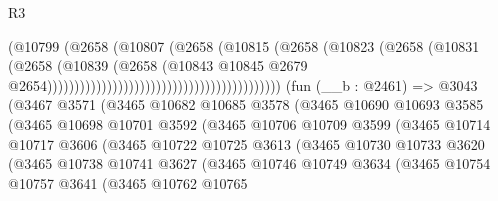 \begin{lexlean}{R3}
\begin{coremodule}
                                                                (@10799
                                                                  (@2658
                                                                    (@10807
                                                                      (@2658
                                                                        (@10815
                                                                          (@2658
                                                                            (@10823
                                                                              (@2658
                                                                                (@10831
                                                                                  (@2658
                                                                                    (@10839
                                                                                      (@2658
                                                                                        (@10843
                                                                                          @10845
                                                                                          @2679
                                                                                          @2654)))))))))))))))))))))))))))))))))))))))))))
    (fun (__b : @2461) =>
    @3043
      (@3467
        @3571
        (@3465
          @10682
          @10685
          @3578
          (@3465
            @10690
            @10693
            @3585
            (@3465
              @10698
              @10701
              @3592
              (@3465
                @10706
                @10709
                @3599
                (@3465
                  @10714
                  @10717
                  @3606
                  (@3465
                    @10722
                    @10725
                    @3613
                    (@3465
                      @10730
                      @10733
                      @3620
                      (@3465
                        @10738
                        @10741
                        @3627
                        (@3465
                          @10746
                          @10749
                          @3634
                          (@3465
                            @10754
                            @10757
                            @3641
                            (@3465
                              @10762
                              @10765

\end{coremodule}
\end{lexlean}

